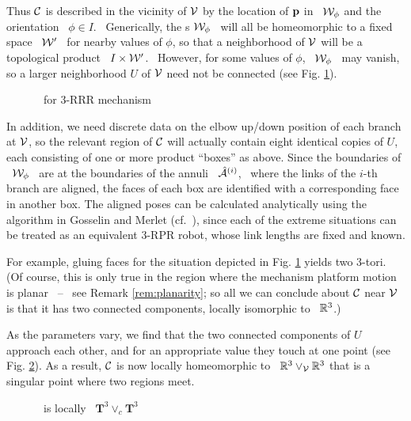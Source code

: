 Thus $\mathcal{C}$ is described in the vicinity of $\mathcal{V}$ by the location of
$\mathbf{p}$ in \ $\mathcal{W}_{\phi}$ and the orientation \ $\phi\in I$. \
Generically, the \wspace s $\mathcal{W}_{\phi}$ \ will all be homeomorphic to
a fixed space \ $\mathcal{W}'$ \ for nearby values of $\phi$, so that a
neighborhood of $\mathcal{V}$ will be a topological product \ $I\times\mathcal{W}'$. \
However, for some values of $\phi$, \ $\mathcal{W}_{\phi}$ \ may vanish, so
a larger neighborhood $U$ of $\mathcal{V}$ need not be connected (see Fig.
\ref{fig:2 boxes}).

\begin{figure}[ht]
\centering
\epsfysize=5.8cm %
\leavevmode {}
\caption{\cspace\ for $3$-RRR mechanism} \label{fig:2 boxes}
\end{figure}

In addition, we need discrete data on the elbow up/down position of
each branch at $\mathcal{V}$, so the relevant region of $\mathcal{C}$ will actually
contain eight identical copies of $U$, each consisting of one or more
product ``boxes'' as above. Since the boundaries of \ $\mathcal{W}_{\phi}$ \
are at the boundaries of the annuli \ $\hat{\mathcal{A}}\sp{({i})}$, \ where the links of
the $i$-th branch are aligned, the faces of each box are identified
with a corresponding face in another box.
The aligned poses can be calculated analytically using the algorithm
in Gosselin and Merlet (cf.\ \cite{GM}), since each of the extreme
situations can be treated as an equivalent $3$-RPR robot, whose
link lengths are fixed and known.

For example, gluing faces for the situation depicted in Fig.
\ref{fig:2 boxes} yields two $3$-tori. (Of course, this is only
true in the region where the mechanism platform motion is planar \
-- \ see Remark \ref{rem:planarity}; so all we can conclude about
$\mathcal{C}$ near $\mathcal{V}$ is that it has two connected components, locally
isomorphic to \ $\mathbb{R}^{3}$.)

As the parameters vary, we find that the two connected components
of $U$ approach each other, and for an appropriate value they
touch at one point (see Fig. \ref{fig:box_kiss}).  As a result,
$\mathcal{C}$ is now locally homeomorphic to \ $\mathbb{R}^{3}
\vee_{\mathcal{V}}\mathbb{R}^{3}$ that is a singular point where two regions
meet.

\begin{figure}[ht]
\centering
\epsfysize=5.8cm %
\leavevmode {} \caption{\cspace\ is
locally \ $\textbf{T}^3\vee_c \textbf{T}^3$} \label{fig:box_kiss}
\end{figure}



